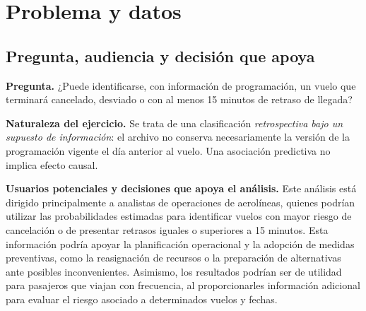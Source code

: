 \documentclass[11pt,a4paper]{article}
\begin{document}
\section{Problema y datos}
 
\subsection{Pregunta, audiencia y decisión que apoya}
 
\textbf{Pregunta.} ¿Puede identificarse, con información de programación, un vuelo que terminará cancelado, desviado o con al menos 15 minutos de retraso de llegada?
 
\textbf{Naturaleza del ejercicio.} Se trata de una clasificación \emph{retrospectiva bajo un supuesto de información}: el archivo no conserva necesariamente la versión de la programación vigente el día anterior al vuelo. Una asociación predictiva no implica efecto causal.
 
\textbf{Usuarios potenciales y decisiones que apoya el análisis.} Este análisis está dirigido principalmente a analistas de operaciones de aerolíneas, quienes podrían utilizar las probabilidades estimadas para identificar vuelos con mayor riesgo de cancelación o de presentar retrasos iguales o superiores a 15 minutos. Esta información podría apoyar la planificación operacional y la adopción de medidas preventivas, como la reasignación de recursos o la preparación de alternativas ante posibles inconvenientes. Asimismo, los resultados podrían ser de utilidad para pasajeros que viajan con frecuencia, al proporcionarles información adicional para evaluar el riesgo asociado a determinados vuelos y fechas.
 
\end{document}
